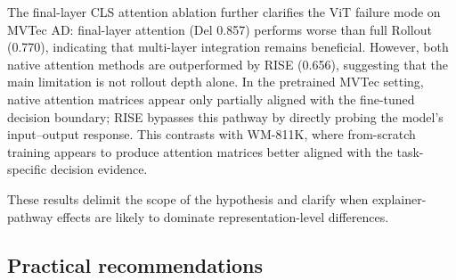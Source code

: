 \documentclass[11pt,a4paper]{article}
\begin{document}
The final-layer CLS attention ablation further clarifies the ViT failure mode on MVTec AD: final-layer attention (Del 0.857) performs worse than full Rollout (0.770), indicating that multi-layer integration remains beneficial. However, both native attention methods are outperformed by RISE (0.656), suggesting that the main limitation is not rollout depth alone. In the pretrained MVTec setting, native attention matrices appear only partially aligned with the fine-tuned decision boundary; RISE bypasses this pathway by directly probing the model's input--output response. This contrasts with WM-811K, where from-scratch training appears to produce attention matrices better aligned with the task-specific decision evidence.

These results delimit the scope of the hypothesis and clarify when explainer-pathway effects are likely to dominate representation-level differences.

\subsection{Practical recommendations}
\end{document}
